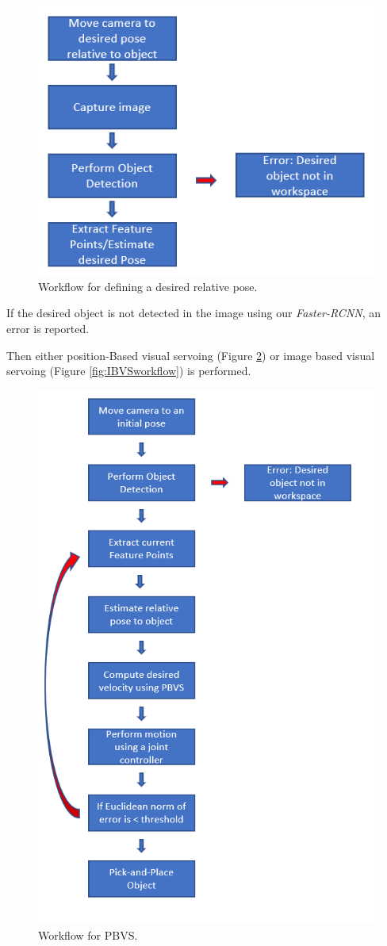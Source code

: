 \documentclass{UoNMCHA}
\numberwithin{equation}{section}
\begin{document}
\begin{figure}[H]
	\begin{center}
		\includegraphics[width=.6\linewidth]{Figures/Definegoalpose}
		\caption{Workflow for defining a desired relative pose.}
		\label{fig:definegoalpose}
	\end{center}
\end{figure}

If the desired object is not detected in the image using our \textit{Faster-RCNN}, an error is reported.\

Then either position-Based visual servoing (Figure \ref{fig:PBVSworkflow}) or image based visual servoing (Figure \ref{fig:IBVSworkflow}) is performed.

\begin{figure}[H]
	\begin{center}
		\includegraphics[width=.6\linewidth]{Figures/PBVSworkflow}
		\caption{Workflow for PBVS.}
		\label{fig:PBVSworkflow}
	\end{center}
\end{figure}
\end{document}
